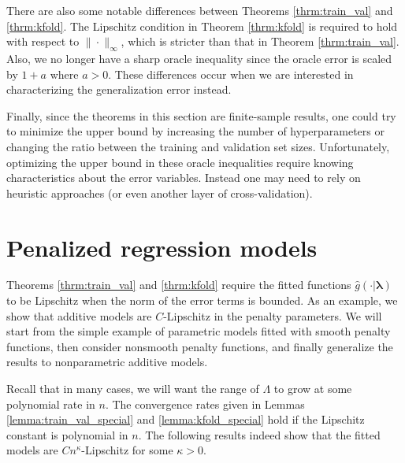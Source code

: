\documentclass[12pt]{article}
\begin{document}
There are also some notable differences between Theorems \ref{thrm:train_val} and \ref{thrm:kfold}. The Lipschitz condition in Theorem \ref{thrm:kfold} is required to hold with respect to $\| \cdot \|_\infty$, which is stricter than that in Theorem \ref{thrm:train_val}. Also, we no longer have a sharp oracle inequality since the oracle error is scaled by $1+a$ where $a > 0$. These differences occur when we are interested in characterizing the generalization error instead.

Finally, since the theorems in this section are finite-sample results, one could try to minimize the upper bound by increasing the number of hyperparameters or changing the ratio between the training and validation set sizes. Unfortunately, optimizing the upper bound in these oracle inequalities require knowing characteristics about the error variables. Instead one may need to rely on heuristic approaches (or even another layer of cross-validation).

\section{Penalized regression models}
\label{sec:examples}

Theorems \ref{thrm:train_val} and \ref{thrm:kfold} require the fitted functions $\hat{g}(\cdot | \boldsymbol{\lambda})$ to be Lipschitz when the norm of the error terms is bounded. As an example, we show that additive models are $C$-Lipschitz in the penalty parameters. We will start from the simple example of parametric models fitted with smooth penalty functions, then consider nonsmooth penalty functions, and finally generalize the results to nonparametric additive models. 

Recall that in many cases, we will want the range of $\Lambda$ to grow at some polynomial rate in $n$. The convergence rates given in Lemmas \ref{lemma:train_val_special} and \ref{lemma:kfold_special} hold if the Lipschitz constant is polynomial in $n$. The following results indeed show that the fitted models are $Cn^\kappa$-Lipschitz for some $\kappa > 0$.
\end{document}
